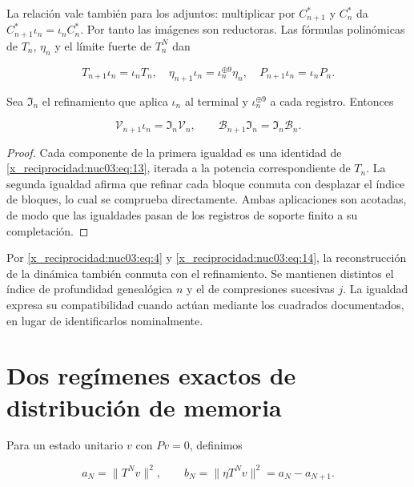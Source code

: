 La relación vale también para los adjuntos: multiplicar por \(C_{n+1}^*\) y \(C_n^*\) da \(C_{n+1}^*\iota_n=\iota_nC_n^*\). Por tanto las imágenes son reductoras. Las fórmulas polinómicas de \(T_n\), \(\eta_n\) y el límite fuerte de \(T_n^N\) dan

\begin{equation}
T_{n+1}\iota_n=\iota_nT_n,\quad
\eta_{n+1}\iota_n=\iota_n^{\oplus9}\eta_n,\quad
P_{n+1}\iota_n=\iota_nP_n.
\label{x_reciprocidad:nuc03:eq:13}
\end{equation}

Sea \(\mathfrak I_n\) el refinamiento que aplica \(\iota_n\) al terminal y \(\iota_n^{\oplus9}\) a cada registro. Entonces

\begin{equation}
\boxed{\mathcal V_{n+1}\iota_n=\mathfrak I_n\mathcal V_n,\qquad
\mathcal B_{n+1}\mathfrak I_n=\mathfrak I_n\mathcal B_n.}
\label{x_reciprocidad:nuc03:eq:14}
\end{equation}

\begin{proof}
Cada componente de la primera igualdad es una identidad de \eqref{x_reciprocidad:nuc03:eq:13}, iterada a la potencia correspondiente de \(T_n\). La segunda igualdad afirma que refinar cada bloque conmuta con desplazar el índice de bloques, lo cual se comprueba directamente. Ambas aplicaciones son acotadas, de modo que las igualdades pasan de los registros de soporte finito a su completación.
\end{proof}

Por \eqref{x_reciprocidad:nuc03:eq:4} y \eqref{x_reciprocidad:nuc03:eq:14}, la reconstrucción de la dinámica también conmuta con el refinamiento. Se mantienen distintos el índice de profundidad genealógica \(n\) y el de compresiones sucesivas \(j\). La igualdad expresa su compatibilidad cuando actúan mediante los cuadrados documentados, en lugar de identificarlos nominalmente.

\section{Dos regímenes exactos de distribución de memoria}

Para un estado unitario \(v\) con \(Pv=0\), definimos

\begin{equation}
a_N=\|T^Nv\|^2,\qquad b_N=\|\eta T^Nv\|^2=a_N-a_{N+1}.
\label{x_reciprocidad:nuc03:eq:15}
\end{equation}

